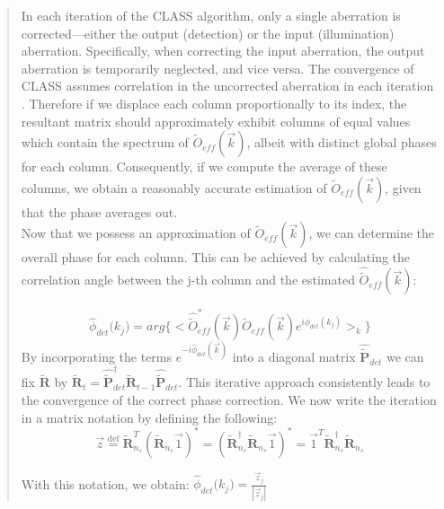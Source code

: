 \documentclass[12pt]{article}
\newenvironment{ourresponse}
    {\begin{tcolorbox}[width=\linewidth,breakable,enhanced,colback=gray!5,colframe=responsecolor!50,title=Response,left=5pt,right=5pt]}
    {\end{tcolorbox}}
\begin{document}
\begin{enumerate}[label=\arabic*.]
\begin{ourresponse}
\begin{quote}
            In each iteration of the CLASS algorithm, only a single aberration is corrected—either the output (detection) or the input (illumination) aberration. Specifically, when correcting the input aberration, the output aberration is temporarily neglected, and vice versa. The convergence of CLASS assumes correlation in the uncorrected aberration in each iteration \cite{kang17}. Therefore if we displace each column proportionally to its index, the resultant matrix should approximately exhibit columns of equal values which contain the spectrum of $\tilde{O}_{eff}(\vec{k})$, albeit with distinct global phases for each column. Consequently, if we compute the average of these columns, we obtain a reasonably accurate estimation of $\tilde{O}_{eff}(\vec{k})$, given that the phase averages out.\\
            Now that we possess an approximation of $\tilde{O}_{eff}(\vec{k})$, we can determine the overall phase for each column. This can be achieved by calculating the correlation angle between the j-th column and the estimated $\hat{\tilde{O}}_{eff}(\vec{k})$:
            
            \begin{equation}
            \hat{\phi}_{det}({k_{j})} = arg\{<\hat{\tilde{O}}_{eff}^*(\vec{k})\tilde{O}_{eff}(\vec{k})e^{i\phi_{det}(k_{j})}>_k\}
            \tag{S6}
            \label{eq:6}
            \end{equation}
            By incorporating the terms $e^{-i\hat{\phi}_{det}(\vec{k})}$ into a diagonal matrix $\hat{\tilde{\textbf{P}}}_{det}$ we can fix $\tilde{\textbf{R}}$ by $\tilde{\textbf{R}}_t=\hat{\tilde{\textbf{P}}}_{det}^{\dagger}\tilde{\textbf{R}}_{t-1}\hat{\tilde{\textbf{P}}}_{det}$. This iterative approach consistently leads to the convergence of the correct phase correction.
            We now write the iteration in a matrix notation by defining the following:
            \begin{equation}
            \vec{z}\stackrel{\text{def}} =  \tilde{\textbf{R}}^{T}_{n_s}(\tilde{\textbf{R}}_{n_s}\vec{1})^*=(\tilde{\textbf{R}}^{\dagger}_{n_s}\tilde{\textbf{R}}_{n_s}\vec{1})^*=\vec{1}^T\tilde{\textbf{R}}^{\dagger}_{n_s}\tilde{\textbf{R}}_{n_s}
            \tag{S7}
            \label{eq:7}
            \end{equation}
            
            With this notation, we obtain:  $\hat{\phi}_{det}({k_{j})}=\frac{\vec{z}_j}{|\vec{z}_j|}$
            

\end{quote}
\end{ourresponse}
\end{enumerate}
\end{document}
